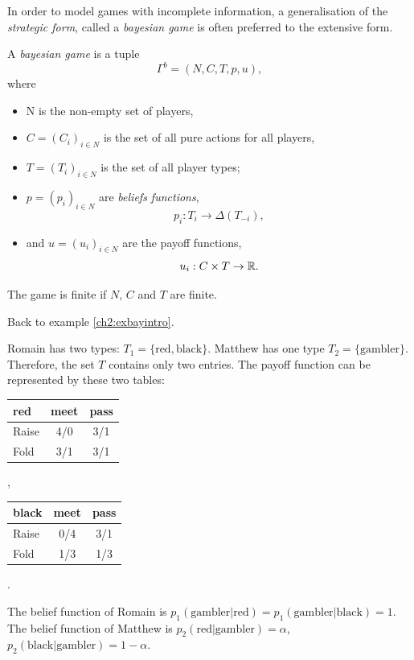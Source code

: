 In order to model games with incomplete information, a generalisation of the \emph{strategic form}, called a \emph{bayesian game} is often preferred to the extensive form.

\begin{definition}
A \emph{bayesian game} is a tuple $$\Gamma^b = (N,C,T,p,u), $$
where
\begin{itemize}
\item N is the non-empty set of players, 
\item $C = (C_i)_{i \in N}$ is the set of all pure actions for all players, 
\item $T = (T_i)_{i \in N}$ is the set of all player types; 
\item $p = (p_i)_{i \in N}$ are \emph{beliefs functions}, 
$$ p_i : T_i \rightarrow \Delta(T_{-i}),$$
\item and $u = (u_i)_{i \in N}$ are the payoff functions, 
$$ u_i : C \times T \rightarrow \mathbb{R}. $$
\end{itemize}
The game is finite if $N$, $C$ and $T$ are finite.
\end{definition}
 \begin{example}
 Back to example \ref{ch2:exbayintro}.
 
 Romain has two types: $T_1 = \{\text{red}, \text{black}\}$. Matthew has one type $T_2  =\{\text{gambler}\}$. Therefore, the set $T$ contains only two entries. 
 The payoff function can be represented by these two tables:
\begin{center}
\begin{tabular}{l|cc}
red & meet & pass \\
\hline
Raise & 4/0 & 3/1 \\
Fold  & 3/1 & 3/1 \\
\end{tabular}, $\qquad$
\begin{tabular}{l|cc}
black & meet & pass \\
\hline
Raise & 0/4 & 3/1 \\
Fold  & 1/3 & 1/3 \\
\end{tabular}.
\end{center}
 
 
 The belief function of Romain is $p_1(\text{gambler}|\text{red}) = p_1(\text{gambler}|\text{black}) = 1.$
The belief function of Matthew is $p_2(\text{red} | \text{gambler}) = \alpha$,  $p_2(\text{black}|\text{gambler}) = 1-\alpha$.
 \end{example}
 
